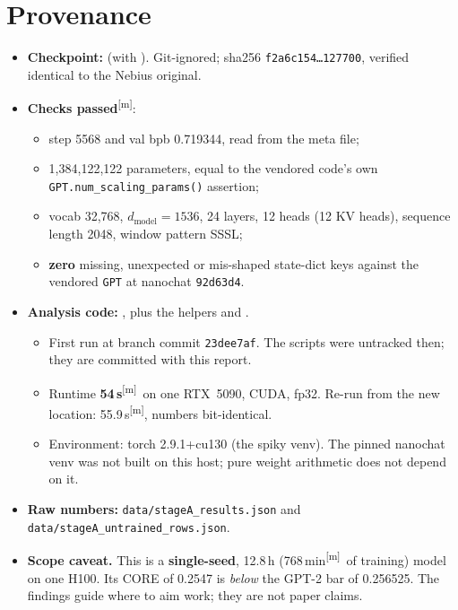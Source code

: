 \documentclass[11pt]{article}
\newcommand{\meas}{\textsuperscript{[m]}}   %
\begin{document}
\section{Provenance}
\begin{itemize}
\item \textbf{Checkpoint:}  (with ). Git-ignored; sha256 \texttt{f2a6c154\ldots127700}, verified identical to the Nebius original.
\item \textbf{Checks passed}\meas:
  \begin{itemize}
  \item step 5568 and val bpb 0.719344, read from the meta file;
  \item 1{,}384{,}122{,}122 parameters, equal to the vendored code's own \texttt{GPT.num\_scaling\_params()} assertion;
  \item vocab 32{,}768, $d_{\text{model}}=1536$, 24 layers, 12 heads (12 KV heads), sequence length 2048, window pattern SSSL;
  \item \textbf{zero} missing, unexpected or mis-shaped state-dict keys against the vendored \texttt{GPT} at nanochat \texttt{92d63d4}.
  \end{itemize}
\item \textbf{Analysis code:} , plus the helpers  and .
  \begin{itemize}
  \item First run at branch commit \texttt{23dee7af}. The scripts were untracked then; they are committed with this report.
  \item Runtime \textbf{54\,s}\meas\ on one RTX~5090, CUDA, fp32. Re-run from the new location: 55.9\,s\meas, numbers bit-identical.
  \item Environment: torch 2.9.1+cu130 (the spiky venv). The pinned nanochat venv was not built on this host; pure weight arithmetic does not depend on it.
  \end{itemize}
\item \textbf{Raw numbers:} \texttt{data/stageA\_results.json} and \texttt{data/stageA\_untrained\_rows.json}.
\item \textbf{Scope caveat.} This is a \textbf{single-seed}, 12.8\,h (768\,min\meas\ of training) model on one H100. Its CORE of 0.2547 is \emph{below} the GPT-2 bar of 0.256525. The findings guide where to aim work; they are not paper claims.
\end{itemize}
\end{document}
